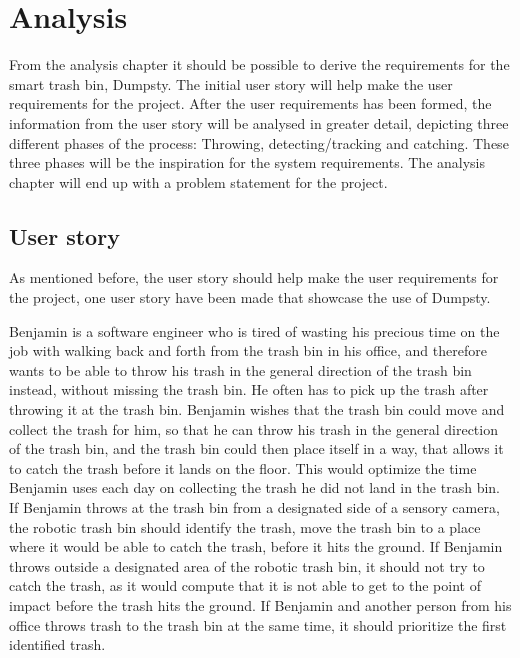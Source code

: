 \chapter{Analysis}
\label{chap:Analysis}
From the analysis chapter it should be possible to derive the requirements for the smart trash bin, Dumpsty. The initial user story will help make the user requirements for the project. After the user requirements has been formed, the information from the user story will be analysed in greater detail, depicting three different phases of the process: Throwing, detecting/tracking and catching. These three phases will be the inspiration for the system requirements. 
The analysis chapter will end up with a problem statement for the project. 

\section{User story}
\label{sec:User story}
As mentioned before, the user story should help make the user requirements for the project, one user story have been made that showcase the use of Dumpsty.

Benjamin is a software engineer who is tired of wasting his precious time on the job with walking back and forth from the trash bin in his office, and therefore wants to be able to throw his trash in the general direction of the trash bin instead, without missing the trash bin. He often has to pick up the trash after throwing it at the trash bin. \newline
Benjamin wishes that the trash bin could move and collect the trash for him, so that he can throw his trash in the general direction of the trash bin, and the trash bin could then place itself in a way, that allows it to catch the trash before it lands on the floor. This would optimize the time Benjamin uses each day on collecting the trash he did not land in the trash bin.\newline
If Benjamin throws at the trash bin from a designated side of a sensory camera, the robotic trash bin should identify the trash, move the trash bin to a place where it would be able to catch the trash, before it hits the ground.\newline
If Benjamin throws outside a designated area of the robotic trash bin, it should not try to catch the trash, as it would compute that it is not able to get to the point of impact before the trash hits the ground.\newline
If Benjamin and another person from his office throws trash to the trash bin at the same time, it should prioritize the first identified trash.

